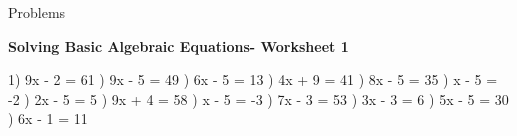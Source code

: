 \documentclass{article}%
\begin{document}
%
\huge%
\vspace*{\fill}%
\begin{center}%
Problems%
\end{center}%
\vspace*{\fill}%
\pagebreak%
\normalsize%
\large%
\begin{center}%
\textbf{Solving Basic Algebraic Equations- Worksheet 1}%
\newline%
\newline%
\newline%
\end{center} \normalsize%
1) 9x - 2 = 61%
\newline%
\newline%
) 9x - 5 = 49%
\newline%
\newline%
) 6x - 5 = 13%
\newline%
\newline%
) 4x + 9 = 41%
\newline%
\newline%
) 8x - 5 = 35%
\newline%
\newline%
) x - 5 = -2%
\newline%
\newline%
) 2x - 5 = 5%
\newline%
\newline%
) 9x + 4 = 58%
\newline%
\newline%
) x - 5 = -3%
\newline%
\newline%
) 7x - 3 = 53%
\newline%
\newline%
) 3x - 3 = 6%
\newline%
\newline%
) 5x - 5 = 30%
\newline%
\newline%
) 6x - 1 = 11%
\end{document}
